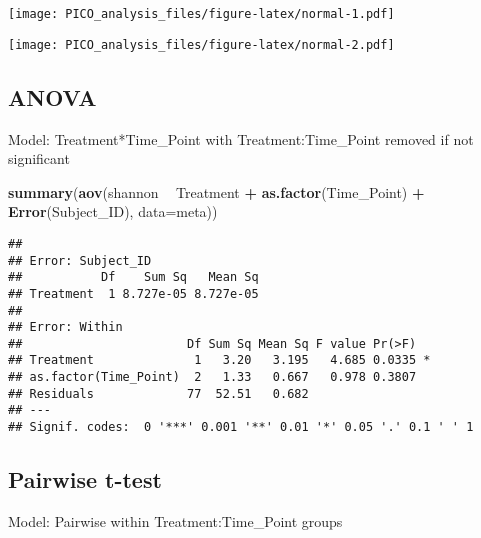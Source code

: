 \documentclass[]{article}
\newenvironment{Shaded}{\begin{snugshade}}{\end{snugshade}}
\newcommand{\KeywordTok}[1]{\textcolor[rgb]{0.13,0.29,0.53}{\textbf{#1}}}
\newcommand{\DataTypeTok}[1]{\textcolor[rgb]{0.13,0.29,0.53}{#1}}
\newcommand{\DecValTok}[1]{\textcolor[rgb]{0.00,0.00,0.81}{#1}}
\newcommand{\StringTok}[1]{\textcolor[rgb]{0.31,0.60,0.02}{#1}}
\newcommand{\CommentTok}[1]{\textcolor[rgb]{0.56,0.35,0.01}{\textit{#1}}}
\newcommand{\OperatorTok}[1]{\textcolor[rgb]{0.81,0.36,0.00}{\textbf{#1}}}
\newcommand{\NormalTok}[1]{#1}
\begin{document}
\texttt{[image: PICO\_analysis\_files/figure-latex/normal-1.pdf]}

\begin{Shaded}
\end{Shaded}

\texttt{[image: PICO\_analysis\_files/figure-latex/normal-2.pdf]}

\subsection{ANOVA}\label{anova}

Model: Treatment*Time\_Point with Treatment:Time\_Point removed if not
significant

\begin{Shaded}
\begin{Highlighting}[]
\KeywordTok{summary}\NormalTok{(}\KeywordTok{aov}\NormalTok{(shannon }\OperatorTok{~}\StringTok{ }\NormalTok{Treatment }\OperatorTok{+}\StringTok{ }\KeywordTok{as.factor}\NormalTok{(Time_Point) }\OperatorTok{+}\StringTok{ }\KeywordTok{Error}\NormalTok{(Subject_ID), }\DataTypeTok{data=}\NormalTok{meta))}
\end{Highlighting}
\end{Shaded}

\begin{verbatim}
## 
## Error: Subject_ID
##           Df    Sum Sq   Mean Sq
## Treatment  1 8.727e-05 8.727e-05
## 
## Error: Within
##                       Df Sum Sq Mean Sq F value Pr(>F)  
## Treatment              1   3.20   3.195   4.685 0.0335 *
## as.factor(Time_Point)  2   1.33   0.667   0.978 0.3807  
## Residuals             77  52.51   0.682                 
## ---
## Signif. codes:  0 '***' 0.001 '**' 0.01 '*' 0.05 '.' 0.1 ' ' 1
\end{verbatim}

\subsection{Pairwise t-test}\label{pairwise-t-test}

Model: Pairwise within Treatment:Time\_Point groups

\begin{Shaded}
\end{Shaded}
\end{document}
